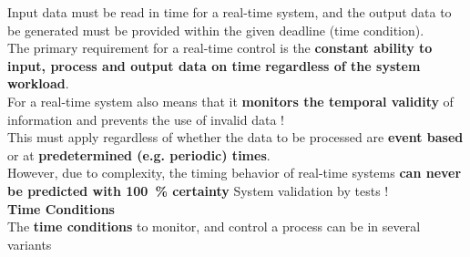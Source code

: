 Input data must be read in time for a real-time system, and the output data to be generated must be provided within the given deadline (time condition). \\

The primary requirement for a real-time control is the \textbf{constant ability to input, process and output data on time regardless of the system workload}.\\ 

For a real-time system also means that it \textbf{monitors the temporal validity} of information and prevents the use of invalid data !\\

This must apply regardless of whether the data to be processed are \textbf{event based} or at \textbf{predetermined (e.g. periodic) times}.\\

However, due to complexity, the timing behavior of real-time systems \textbf{can never be predicted with 100~\% certainty}  System validation by tests !\\

{\rot\bf Time Conditions}\\

The \textbf{time conditions} to monitor, and control a process can be in several variants

